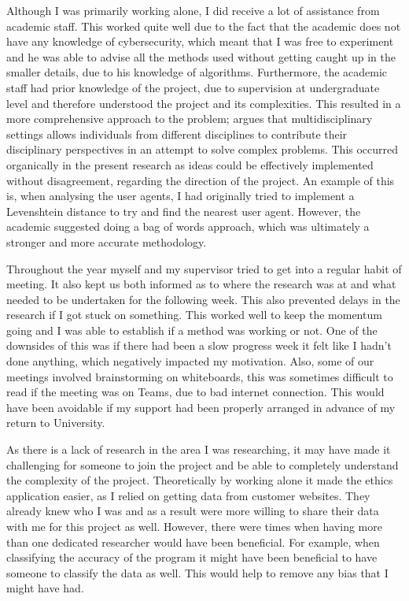 Although I was primarily working alone, I did receive a lot of assistance from academic staff. This worked quite well due to the fact that the academic does not have any knowledge of cybersecurity, which meant that I was free to experiment and he was able to advise all the methods used without getting caught up in the smaller details, due to his knowledge of algorithms. Furthermore, the academic staff had prior knowledge of the project, due to supervision at undergraduate level and therefore understood the project and its complexities. This resulted in a more comprehensive approach to the problem; \cite{thurow1999dynamics} argues that multidisciplinary settings allows individuals from different disciplines to contribute their disciplinary perspectives in an attempt to solve complex problems. This occurred organically in the present research as ideas could be effectively implemented without disagreement, regarding the direction of the project. An example of this is, when analysing the user agents, I had originally tried to implement a Levenshtein distance to try and find the nearest user agent. However, the academic suggested doing a bag of words approach, which was ultimately a stronger and more accurate methodology. 

Throughout the year myself and my supervisor tried to get into a regular habit of meeting. It also kept us both informed as to where the research was at and what needed to be undertaken for the following week. This also prevented delays in the research if I got stuck on something. This worked well to keep the momentum going and I was able to establish if a method was working or not. One of the downsides of this was if there had been a slow progress week it felt like I hadn't done anything, which negatively impacted my motivation. Also, some of our meetings involved brainstorming on whiteboards, this was sometimes difficult to read if the meeting was on Teams, due to bad internet connection. This would have been avoidable if my support had been properly arranged in advance of my return to University.

As there is a lack of research in the area I was researching, it may have made it challenging for someone to join the project and be able to completely understand the complexity of the project. Theoretically by working alone it made the ethics application easier, as I relied on getting data from customer websites. They already knew who I was and as a result were more willing to share their data with me for this project as well. However, there were times when having more than one dedicated researcher would have been beneficial. For example, when classifying the accuracy of the program it might have been beneficial to have someone to classify the data as well. This would help to remove any bias that I might have had.

